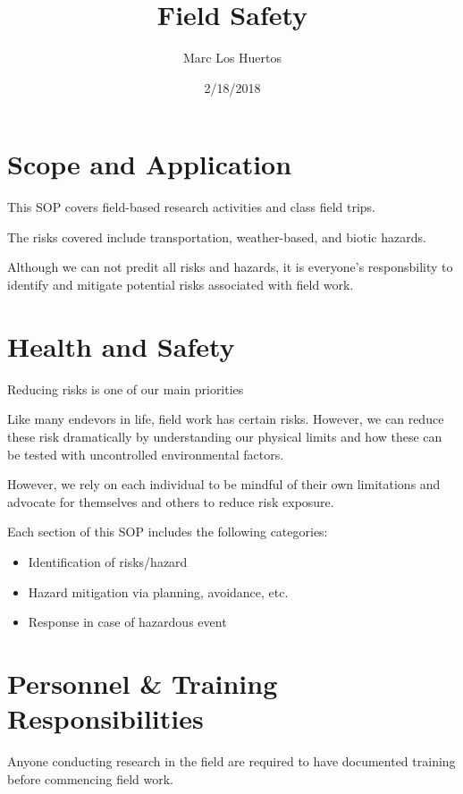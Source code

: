 \documentclass[12pt]{../SOP4_alpha}\usepackage[]{graphicx}\usepackage[]{color}
\title{Field Safety}
\date{2/18/2018}
\author{Marc Los Huertos}
\begin{document}
\maketitle

\section{Scope and Application}

\NP This SOP covers field-based research activities and class field trips. 

\NP The risks covered include transportation, weather-based, and biotic hazards.

\NP Although we can not predit all risks and hazards, it is everyone's responsbility to identify and mitigate potential risks associated with field work.

\tableofcontents
\newpage

\section{Health and Safety}

\NP Reducing risks is one of our main priorities

\NP Like many endevors in life, field work has certain risks. However, we can reduce these risk dramatically by understanding our physical limits and how these can be tested with uncontrolled environmental factors.

\NP However, we rely on each individual to be mindful of their own limitations and advocate for themselves and others to reduce risk exposure.

\NP Each section of this SOP includes the following categories:

\begin{itemize}
  \item Identification of risks/hazard
  \item Hazard mitigation via planning, avoidance, etc.
  \item Response in case of hazardous event
\end{itemize}

\section{Personnel \& Training Responsibilities}

\NP Anyone conducting research in the field are required to have documented training before commencing field work. 
\end{document}
